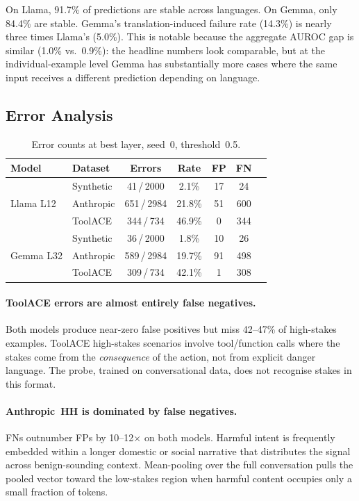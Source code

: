 \documentclass{article}
\newcommand{\auroc}{AUROC\xspace}
\begin{document}
On Llama, 91.7\% of predictions are stable across languages.
On Gemma, only 84.4\% are stable.
Gemma's translation-induced failure rate (14.3\%) is nearly three times Llama's
(5.0\%).
This is notable because the aggregate \auroc gap is similar (1.0\% vs.\ 0.9\%):
the headline numbers look comparable, but at the individual-example level Gemma
has substantially more cases where the same input receives a different prediction
depending on language.

\subsection{Error Analysis}
\label{sec:errors}

\begin{table}[h]
\centering
\caption{Error counts at best layer, seed~0, threshold~0.5.}
\label{tab:errors}
\begin{tabular}{llccccc}
\toprule
Model        & Dataset   & Errors      & Rate   & FP & FN \\
\midrule
\multirow{3}{*}{Llama L12}
 & Synthetic  & 41\,/\,2000 &  2.1\% & 17 & 24 \\
 & Anthropic  & 651\,/\,2984 & 21.8\% & 51 & 600 \\
 & ToolACE    & 344\,/\,734 & 46.9\% &  0 & 344 \\
\midrule
\multirow{3}{*}{Gemma L32}
 & Synthetic  & 36\,/\,2000 &  1.8\% & 10 & 26 \\
 & Anthropic  & 589\,/\,2984 & 19.7\% & 91 & 498 \\
 & ToolACE    & 309\,/\,734 & 42.1\% &  1 & 308 \\
\bottomrule
\end{tabular}
\end{table}

\paragraph{ToolACE errors are almost entirely false negatives.}
Both models produce near-zero false positives but miss 42--47\% of high-stakes
examples.
ToolACE high-stakes scenarios involve tool/function calls where the stakes come
from the \emph{consequence} of the action, not from explicit danger language.
The probe, trained on conversational data, does not recognise stakes in this
format.

\paragraph{Anthropic~HH is dominated by false negatives.}
FNs outnumber FPs by 10--12$\times$ on both models.
Harmful intent is frequently embedded within a longer domestic or social
narrative that distributes the signal across benign-sounding context.
Mean-pooling over the full conversation pulls the pooled vector toward the
low-stakes region when harmful content occupies only a small fraction of tokens.
\end{document}
